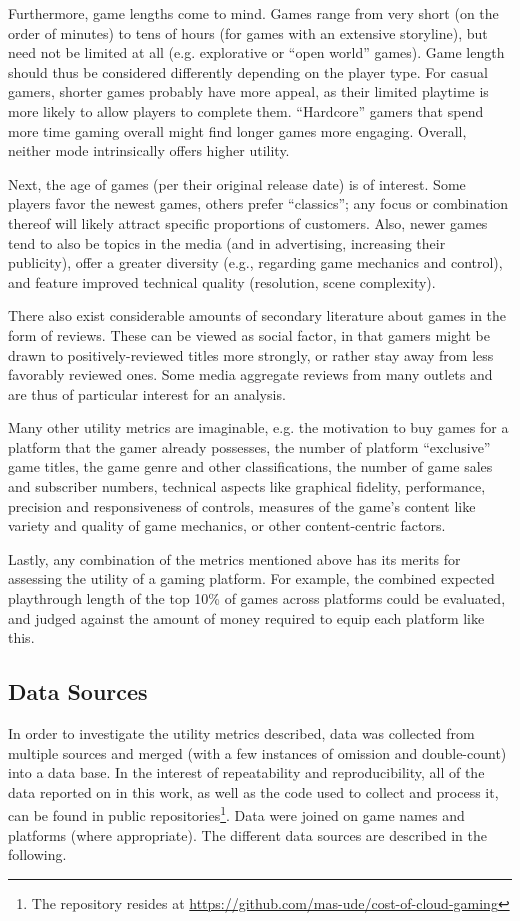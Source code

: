 Furthermore, game lengths come to mind. Games range from very short
(on the order
of minutes) to tens of hours (for games with an extensive storyline),
but need not be limited at all (e.g. explorative or ``open world'' games).
Game length should thus be considered differently depending on
the player type. For casual gamers, shorter games probably have
more appeal, as their limited playtime is more likely to allow
players to complete them. ``Hardcore'' gamers that spend more
time gaming overall might find longer games more engaging.
Overall, neither mode intrinsically offers higher utility.

Next, the age of games (per their original release date) is of
interest. Some players favor the newest games, others prefer ``classics'';
any focus or combination thereof will likely attract specific
proportions of customers. Also, newer games tend to also be topics
in the media (and in advertising, increasing their publicity),
offer a greater diversity (e.g., regarding game mechanics and control),
and feature improved technical quality (resolution, scene complexity).


There also exist considerable amounts of secondary literature about
games in the form of reviews. These can be viewed as social factor,
in that gamers might be drawn to positively-reviewed titles more
strongly, or rather stay away from less favorably reviewed ones.
Some media aggregate reviews from many outlets and
are thus of particular interest for an analysis.

Many other utility metrics are imaginable, e.g.
the motivation to buy games for a platform that the gamer already
possesses,
the number of platform ``exclusive'' game titles,
the game genre and other classifications,
the number of game sales and subscriber numbers,
technical aspects like graphical fidelity, performance, precision
and responsiveness of controls,
measures of the game's content like variety and quality of game mechanics,
or other content-centric factors.

Lastly, any combination of the metrics mentioned above has its
merits for assessing the utility of a gaming platform. For example,
the combined expected playthrough length of the top 10\% of games
across platforms could be evaluated, and judged against the amount
of money required to equip each platform like this.

\subsection{Data Sources}
In order to investigate the utility metrics described, data was collected from
multiple sources and merged (with a few instances of omission and
double-count) into a data base. In the interest of repeatability and
reproducibility, all of the data reported on in this work, as well as
the code used to collect and process it, can be found in public
repositories\footnote{The repository resides at
\url{https://github.com/mas-ude/cost-of-cloud-gaming}}.
Data were joined on game names and platforms (where appropriate).
The different data sources are described in the following.

